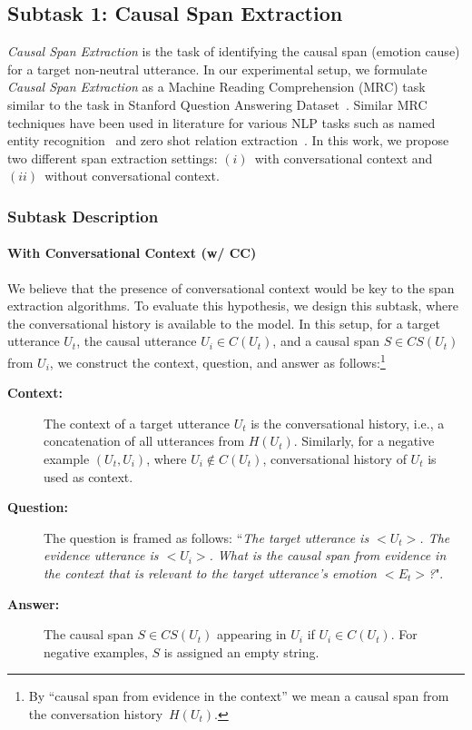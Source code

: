 \documentclass[smallextended]{svjour3}
\newcommand\0{\hphantom{0}}
\begin{document}
\subsection{Subtask 1: Causal Span Extraction}
\label{sec:cse}
\textit{Causal Span Extraction} is the task of identifying the causal span (emotion cause) for a target non-neutral utterance. In our experimental setup, we formulate \textit{Causal Span Extraction} as a Machine Reading Comprehension (MRC) task similar to the task in Stanford Question Answering Dataset~\citep{rajpurkar2016squad}. Similar MRC techniques have been used in literature for various NLP tasks such as named entity recognition~\citep{li-etal-2020-unified} and zero shot relation extraction~\citep{levy-etal-2017-zero}. In this work, we propose two different span extraction settings: \textit{$(i)$}~with conversational context and \textit{$(ii)$}~without conversational context.


\subsubsection{Subtask Description}









\paragraph{With Conversational Context (w/ CC)}
We 
believe
that the presence of conversational context would be key to the span extraction algorithms. To evaluate this hypothesis, we design this subtask, where the conversational history is available to the model. In this setup, for a target utterance $U_t$, the causal utterance $U_i \in C(U_t)$, and a causal span $S \in CS(U_t)$ from $U_i$, we construct the context, question, and answer as follows:\footnote{By ``causal span from evidence in the context'' we mean a causal span from the conversation history~$H(U_t)$.}
\begin{description}
\item[\textbf{Context:}] The context of a target utterance $U_t$ is the conversational history, i.e., a concatenation of all utterances from $H(U_t)$.
Similarly, for a negative example $(U_t, U_i)$, where $U_i \notin C(U_t)$, conversational history of $U_t$ is used as context.\\
\item[\textbf{Question:}] The question is framed as follows: ``\textit{The target utterance is ${<}U_t{>}$. The evidence utterance is ${<}U_i{>}$. What is the causal span from evidence in the context that is relevant to the target utterance's emotion ${<}E_t{>}$?}".
\item[\textbf{Answer:}] The causal span $S \in CS(U_t)$ appearing in $U_i$ if $U_i \in C(U_t)$. For negative examples, $S$ is assigned an empty string. 
\end{description}
\end{document}
